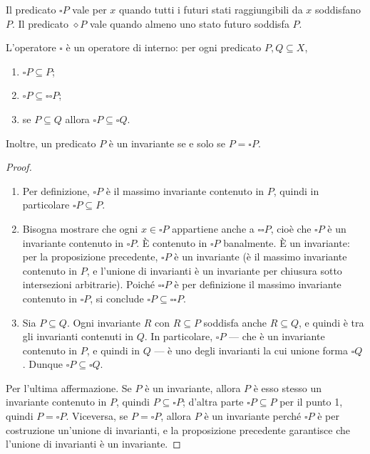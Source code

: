 Il predicato \(\square P\) vale per \(x\) quando tutti i futuri stati raggiungibili da \(x\) soddisfano \(P\). Il predicato \(\diamond P\) vale quando almeno uno stato futuro soddisfa \(P\).

\begin{proposition}
  L'operatore \(\square\) è un operatore di interno: per ogni predicato \(P, Q \subseteq X\),
  \begin{enumerate}
    \item \(\square P \subseteq P\);
    \item \(\square P \subseteq \square\square P\);
    \item se \(P \subseteq Q\) allora \(\square P \subseteq \square Q\).
  \end{enumerate}
  Inoltre, un predicato \(P\) è un invariante se e solo se \(P = \square P\).
\end{proposition}

\begin{proof}
  \begin{enumerate}
    \item Per definizione, \(\square P\) è il massimo invariante contenuto in \(P\), quindi in particolare \(\square P \subseteq P\).
    \item Bisogna mostrare che ogni \(x \in \square P\) appartiene anche a \(\square\square P\), cioè che \(\square P\) è un invariante contenuto in \(\square P\). È contenuto in \(\square P\) banalmente. È un invariante: per la proposizione precedente, \(\square P\) è un invariante (è il massimo invariante contenuto in \(P\), e l'unione di invarianti è un invariante per chiusura sotto intersezioni arbitrarie). Poiché \(\square\square P\) è per definizione il massimo invariante contenuto in \(\square P\), si conclude \(\square P \subseteq \square\square P\).
    \item Sia \(P \subseteq Q\). Ogni invariante \(R\) con \(R \subseteq P\) soddisfa anche \(R \subseteq Q\), e quindi è tra gli invarianti contenuti in \(Q\). In particolare, \(\square P\) — che è un invariante contenuto in \(P\), e quindi in \(Q\) — è uno degli invarianti la cui unione forma \(\square Q\). Dunque \(\square P \subseteq \square Q\).
  \end{enumerate}
  Per l'ultima affermazione. Se \(P\) è un invariante, allora \(P\) è esso stesso un invariante contenuto in \(P\), quindi \(P \subseteq \square P\); d'altra parte \(\square P \subseteq P\) per il punto 1, quindi \(P = \square P\). Viceversa, se \(P = \square P\), allora \(P\) è un invariante perché \(\square P\) è per costruzione un'unione di invarianti, e la proposizione precedente garantisce che l'unione di invarianti è un invariante.
\end{proof}